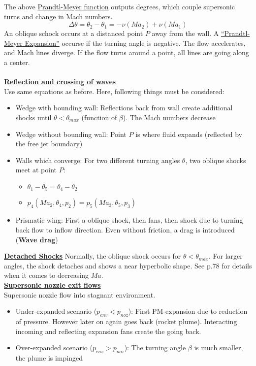 \documentclass[8pt, landscape, fleqn]{scrartcl}
\begin{document}
\begin{multicols*}{3}
The above \underline{Prandtl-Meyer function} outputs degrees, which couple supersonic turns and change in Mach numbers.
\begin{equation*}
    \Delta \theta = \theta_2 - \theta_1 = -\nu(Ma_2) + \nu(Ma_1)
\end{equation*}
An oblique schock occurs at a distanced point $P$ away from the wall. A \underline{``Prandtl-Meyer Expansion''} occurse if the turning angle is negative. The flow accelerates, and Mach lines diverge. If the flow turns around a point, all lines are going along a center. \\ \\
\underline{\textbf{Reflection and crossing of waves}} \\
Use same equations as before. Here, following things must be considered:
\begin{itemize}
    \item Wedge with bounding wall: Reflections back from wall create additional shocks until $\theta < \theta_{max}$ (function of $\beta$). The Mach numbers decrease
    \item Wedge without bounding wall: Point $P$ is where fluid expands (reflected by the free jet boundary)
    \item Walls which converge: For two different turning angles $\theta$, two oblique shocks meet at point $P$:
    \begin{itemize}
        \item $\theta_1-\theta_5 = \theta_4 - \theta_2$
        \item $p_4(Ma_2, \theta_4, p_2) = p_5(Ma_3, \theta_5, p_3)$
    \end{itemize}
    \item Prismatic wing: First a oblique shock, then fans, then shock due to turning back flow to inflow direction. Even without friction, a drag is introduced (\textbf{Wave drag})
\end{itemize}
\underline{\textbf{Detached Shocks}}
Normally, the oblique shock occurs for $\theta < \theta_{max}$. For larger angles, the shock detaches and shows a near hyperbolic shape. See p.78 for details when it comes to decreasing $Ma$. \\

\underline{\textbf{Supersonic nozzle exit flows}} \\
Supersonic nozzle flow into stagnant environment.
\begin{itemize}
    \item Under-expanded scenario ($p_{env}<p_{noz}$): First PM-expansion due to reduction of pressure. However later on again goes back (rocket plume). Interacting incoming and reflecting expansion fans create the going back.
    \item Over-expanded scenario ($p_{env}>p_{noz}$): The turning angle $\beta$ is much smaller, the plume is impinged
\end{itemize}


\end{multicols*}
\end{document}
